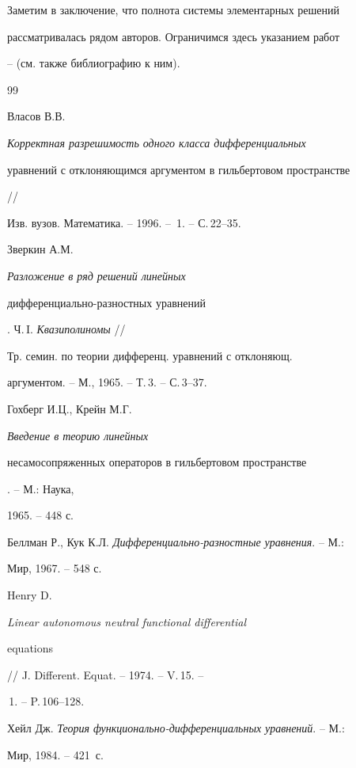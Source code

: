 


Заметим в заключение, что полнота системы элементарных решений 


рассматривалась рядом авторов. Ограничимся здесь указанием работ 


\cite{13}--\cite{14} (см. также библиографию к ним). 


 


 


\begin{thebibliography}{99} 


 




Власов В.В. {\em Корректная разрешимость одного класса дифференциальных 


уравнений с отклоняющимся аргументом в гильбертовом пространстве} // 


Изв. вузов. Математика. -- 1996. -- \No\,1. -- С.\,22--35. 




Зверкин А.М. {\em Разложение в ряд решений линейных 


дифференциально-разностных уравнений}. Ч.\,I. {\em Квазиполиномы} // 


Тр. семин. по теории дифференц. уравнений с отклоняющ.


аргументом. -- М., 1965. -- Т.\,3. -- С.\,3--37. 




Гохберг И.Ц., Крейн М.Г. {\em Введение в теорию линейных 


несамосопряженных операторов в гильбертовом пространстве}. -- М.: Наука, 


1965. -- 448 с. 




Беллман Р., Кук К.Л. {\em Дифференциально-разностные уравнения}. -- М.: 


Мир, 1967. -- 548 с. 




Henry D. {\em Linear autonomous neutral functional differential 


equations} // J. Different. Equat. -- 1974. -- V.\,15. -- 


\No\,1. -- P.\,106--128. 




Хейл Дж. {\em Теория функционально-дифференциальных уравнений}. -- М.: 


Мир, 1984. -- 421~с. 



\end{thebibliography}

